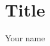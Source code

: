 \title{Title} %
\author{Your name} %
\newcommand{\CourseName}{Your Couse Name} %
\newcommand{\StudentId}{Your Student Id}  %